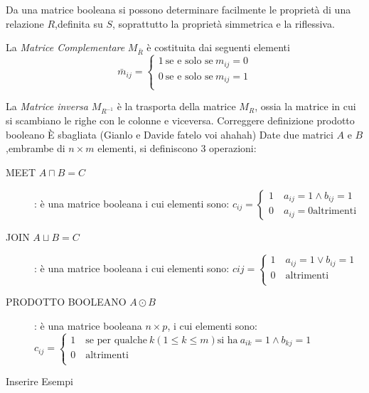 
Da una matrice booleana si possono determinare facilmente le proprietà
di una relazione $R$,definita su $S$, soprattutto la proprietà simmetrica e la riflessiva.

La \emph{Matrice Complementare} $M_{\bar{R}}$ è costituita dai seguenti elementi
\begin{equation*}
    \bar{m}_{ij} = \begin{cases} 1 \ \text{se e solo se} \ m_{ij} = 0 \\
                                 0 \ \text{se e solo se} \ m_{ij} = 1 \\
                   \end{cases}
\end{equation*}

La \emph{Matrice inversa} $M_{R ^{-1}}$ è la trasporta della matrice $M_R$, ossia la matrice
in cui si scambiano le righe con le colonne e viceversa.
Correggere definizione prodotto booleano
È sbagliata (Gianlo e  Davide fatelo voi ahahah)
Date due matrici $A$ e $B$,embrambe di $n \times m$ elementi, si definiscono 3 operazioni:
\begin{description}
    \item[MEET $A \sqcap B = C$]: è una matrice booleana i cui elementi sono:\newline
$c_{ij} =  \begin{cases} 1 \quad a_{ij} = 1 \land b_{ij} = 1 \\ 0 \quad a_{ij} = 0 \text{altrimenti} \end{cases}$
    \item[JOIN $A \sqcup B = C$]: è una matrice booleana i cui elementi sono:\newline
    $c{ij} = \begin{cases} 1 \quad a_{ij} = 1 \lor b_{ij} = 1 \\
                           0 \quad \text{altrimenti}\\ \end{cases}$
    \item[PRODOTTO BOOLEANO $A \odot B$]: è una matrice booleana $n \times p$, i cui elementi sono:\newline
    $c_{ij} = \begin{cases} 1 \quad \text{se per qualche} \ k(1 \leq k \leq m) \text{si ha} \ a_{ik} = 1 \land b_{kj} = 1\\
                            0 \quad \text{altrimenti} \\ \end{cases}$
\end{description}

Inserire Esempi


